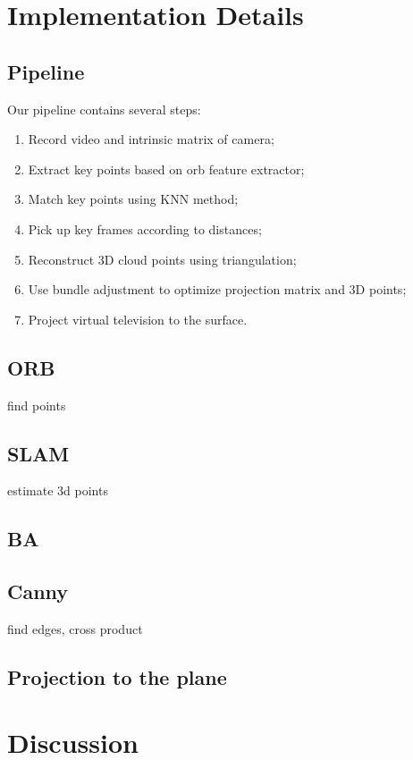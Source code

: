 \documentclass[paper=a4, fontsize=14pt]{scrartcl}
\numberwithin{equation}{section}                %
\numberwithin{figure}{section}                  %
\numberwithin{table}{section}                           %
\begin{document}
\section{Implementation Details}\label{implementation}
\subsection{Pipeline}
Our pipeline contains several steps: 
\begin{enumerate}
    \item Record video and intrinsic matrix of camera; 
    \item Extract key points based on orb feature extractor; 
    \item Match key points using KNN method; 
    \item Pick up key frames according to distances; 
    \item Reconstruct 3D cloud points using triangulation; 
    \item Use bundle adjustment to optimize projection matrix and 3D points; 
    \item Project virtual television to the surface. 
\end{enumerate}

\subsection{ORB} find points

\subsection{SLAM} estimate 3d points

\subsection{BA}

\subsection{Canny} find edges, cross product

\subsection{Projection to the plane}

\section{Discussion}\label{discussion}





\end{document}
